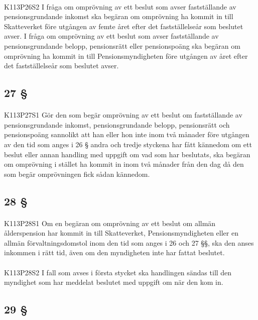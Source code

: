 \documentclass[a4paper,notitlepage,openany,10pt]{book}
\begin{document}
\paragraph*{}
{\tiny K113P26S2}
I fråga om omprövning av ett beslut som avser fastställande av pensionsgrundande inkomst ska begäran om omprövning ha kommit in till Skatteverket före utgången av femte året efter det fastställelseår som beslutet avser.
I fråga om omprövning av ett beslut som avser fastställande av pensionsgrundande belopp, pensionsrätt eller pensionspoäng ska begäran om omprövning ha kommit in till Pensionsmyndigheten före utgången av året efter det fastställelseår som beslutet avser.
\subsection*{27 §}
\paragraph*{}
{\tiny K113P27S1}
Gör den som begär omprövning av ett beslut om fastställande av pensionsgrundande inkomst, pensionsgrundande belopp, pensionsrätt och pensionspoäng sannolikt att han eller hon inte inom två månader före utgången av den tid som anges i 26 § andra och tredje styckena har fått kännedom om ett beslut eller annan handling med uppgift om vad som har beslutats, ska begäran om omprövning i stället ha kommit in inom två månader från den dag då den som begär omprövningen fick sådan kännedom.
\subsection*{28 §}
\paragraph*{}
{\tiny K113P28S1}
Om en begäran om omprövning av ett beslut om allmän ålderspension har kommit in till Skatteverket, Pensionsmyndigheten eller en allmän förvaltningsdomstol inom den tid som anges i 26 och 27 §§, ska den anses inkommen i rätt tid, även om den myndigheten inte har fattat beslutet.
\paragraph*{}
{\tiny K113P28S2}
I fall som avses i första stycket ska handlingen sändas till den myndighet som har meddelat beslutet med uppgift om när den kom in.
\subsection*{29 §}
\end{document}
